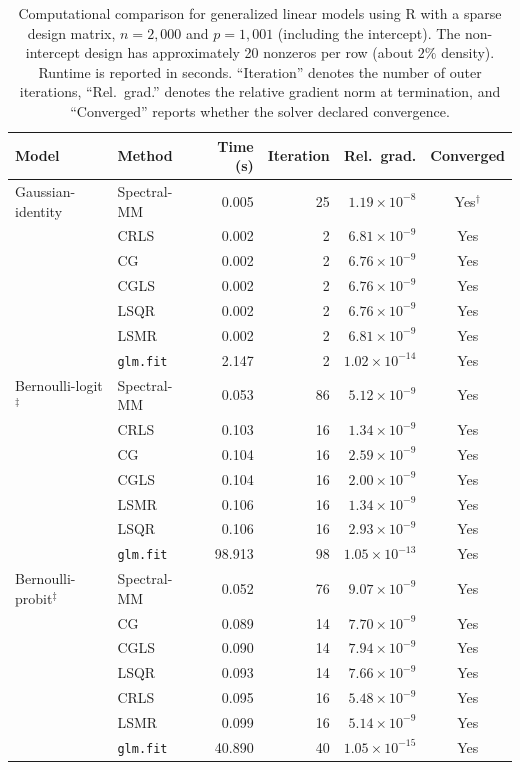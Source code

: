 \clearpage

\begin{table}[htbp]
\centering
\small
\setlength{\tabcolsep}{4pt}
\caption{
Computational comparison for generalized linear models using R with a sparse design matrix,
$n=2{,}000$ and $p=1{,}001$ (including the intercept).
The non-intercept design has approximately 20 nonzeros per row (about $2\%$ density).
Runtime is reported in seconds. ``Iteration\textquotedblright{} denotes the number of outer iterations,
``Rel.\ grad.\textquotedblright{} denotes the relative gradient norm at termination, and
``Converged\textquotedblright{} reports whether the solver declared convergence.}
\label{tab:r-glm-comparison-sparse}
\begin{tabular}{llrrrc}
\toprule
Model & Method & Time (s) & Iteration & Rel.\ grad. & Converged \\
\midrule

Gaussian-identity
& Spectral-MM & 0.005 & 25 & $1.19\times10^{-8}$ & Yes$^{\dagger}$ \\
& CRLS & 0.002 & 2 & $6.81\times10^{-9}$ & Yes \\
& CG & 0.002 & 2 & $6.76\times10^{-9}$ & Yes \\
& CGLS & 0.002 & 2 & $6.76\times10^{-9}$ & Yes \\
& LSQR & 0.002 & 2 & $6.76\times10^{-9}$ & Yes \\
& LSMR & 0.002 & 2 & $6.81\times10^{-9}$ & Yes \\
& \texttt{glm.fit} & 2.147 & 2 & $1.02\times10^{-14}$ & Yes \\
\midrule

Bernoulli-logit$^{\ddagger}$
& Spectral-MM & 0.053 & 86 & $5.12\times10^{-9}$ & Yes \\
& CRLS & 0.103 & 16 & $1.34\times10^{-9}$ & Yes \\
& CG & 0.104 & 16 & $2.59\times10^{-9}$ & Yes \\
& CGLS & 0.104 & 16 & $2.00\times10^{-9}$ & Yes \\
& LSMR & 0.106 & 16 & $1.34\times10^{-9}$ & Yes \\
& LSQR & 0.106 & 16 & $2.93\times10^{-9}$ & Yes \\
& \texttt{glm.fit} & 98.913 & 98 & $1.05\times10^{-13}$ & Yes \\
\midrule

Bernoulli-probit$^{\ddagger}$
& Spectral-MM & 0.052 & 76 & $9.07\times10^{-9}$ & Yes \\
& CG & 0.089 & 14 & $7.70\times10^{-9}$ & Yes \\
& CGLS & 0.090 & 14 & $7.94\times10^{-9}$ & Yes \\
& LSQR & 0.093 & 14 & $7.66\times10^{-9}$ & Yes \\
& CRLS & 0.095 & 16 & $5.48\times10^{-9}$ & Yes \\
& LSMR & 0.099 & 16 & $5.14\times10^{-9}$ & Yes \\
& \texttt{glm.fit} & 40.890 & 40 & $1.05\times10^{-15}$ & Yes \\
\midrule


\end{tabular}
\end{table}
